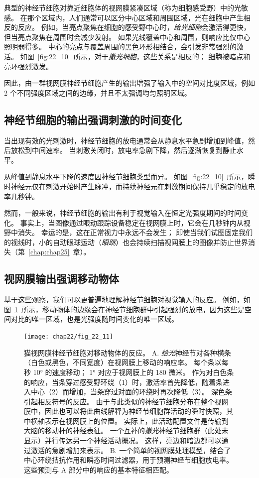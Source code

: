 典型的神经节细胞对靠近细胞体的视网膜紧凑区域（称为细胞感受野）中的光敏感。
在那个区域内，人们通常可以区分中心区域和周围区域，光在细胞中产生相反的反应。
例如，当亮点聚焦在细胞的感受野中心时，\textit{给光细胞}会激活得更快，但当亮点聚焦在周围时会减少发射。
如果光线覆盖中心和周围，则响应比仅中心照明弱得多。 
中心的亮点与覆盖周围的黑色环形相结合，会引发非常强烈的激活。
如图~\ref{fig:22_10}~所示，对于\textit{撤光细胞}，这些关系是相反的；
细胞被暗点和亮环强烈激发。



因此，由一群视网膜神经节细胞产生的输出增强了输入中的空间对比度区域，例如 2 个不同强度区域之间的边缘，并且不太强调均匀照明区域。



\subsection{神经节细胞的输出强调刺激的时间变化}

当出现有效的光刺激时，神经节细胞的放电通常会从静息水平急剧增加到峰值，然后放松到中间速率。
当刺激关闭时，放电率急剧下降，然后逐渐恢复到静止水平。


从峰值到静息水平下降的速度因神经节细胞类型而异。
如图~\ref{fig:22_10}~所示，瞬时神经元仅在刺激开始时产生脉冲，而持续神经元在刺激期间保持几乎稳定的放电率几秒钟。


然而，一般来说，神经节细胞的输出有利于视觉输入在恒定光强度期间的时间变化。
事实上，当图像通过眼动跟踪设备稳定在视网膜上时，它会在几秒钟内从视野中消失。
幸运的是，这在正常视力中永远不会发生；
即使当我们试图固定我们的视线时，小的自动眼球运动（\textit{眼跳}）也会持续扫描视网膜上的图像并防止世界消失（第~\ref{chap:chap25}~章）。



\subsection{视网膜输出强调移动物体}

基于这些观察，我们可以更普遍地理解神经节细胞对视觉输入的反应。
例如，如图~\ref{fig:22_11}~所示，移动物体的边缘会在神经节细胞群中引起强烈的放电，因为这些是空间对比的唯一区域，也是光强度随时间变化的唯一区域。


\begin{figure}[htbp]
	\centering
	\texttt{[image: chap22/fig\_22\_11]}
	\caption{猫视网膜神经节细胞对移动物体的反应。 
		A. \textit{给光}神经节对各种横条（白色或黑色，不同宽度）在视网膜上移动的响应率。 
		每个条以每秒 10° 的速度移动； 1° 对应于视网膜上的 180 微米。
		作为对白色条的响应，当条穿过感受野环绕（1）时，激活率首先降低，随着条进入中心（2）而增加，当条穿过对面的环绕时再次降低（3）。
		深色条引起相反符号的反应。 
		由于与此类似的神经节细胞分布在整个视网膜中，因此也可以将此曲线解释为神经节细胞群活动的瞬时快照，其中横轴表示在视网膜上的位置。 
		实际上，此活动配置文件是传输到大脑的移动杆的神经表征。 
		一个互补的\textit{撤光}神经节细胞群（此处未显示）并行传达另一个神经活动概况。 这样，亮边和暗边都可以通过激活的急剧增加来表示。 
		B. 一个简单的视网膜处理模型，结合了中心环绕拮抗作用和瞬态时间过滤器，用于预测神经节细胞放电率。 
		这些预测与 A 部分中的响应的基本特征相匹配。}
	\label{fig:22_11}
\end{figure}


